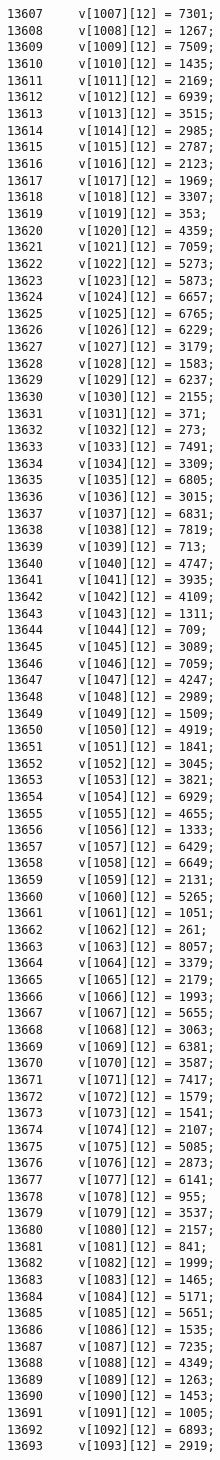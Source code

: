 \begin{Code}
\begin{verbatim}
13607     v[1007][12] = 7301;
13608     v[1008][12] = 1267;
13609     v[1009][12] = 7509;
13610     v[1010][12] = 1435;
13611     v[1011][12] = 2169;
13612     v[1012][12] = 6939;
13613     v[1013][12] = 3515;
13614     v[1014][12] = 2985;
13615     v[1015][12] = 2787;
13616     v[1016][12] = 2123;
13617     v[1017][12] = 1969;
13618     v[1018][12] = 3307;
13619     v[1019][12] = 353;
13620     v[1020][12] = 4359;
13621     v[1021][12] = 7059;
13622     v[1022][12] = 5273;
13623     v[1023][12] = 5873;
13624     v[1024][12] = 6657;
13625     v[1025][12] = 6765;
13626     v[1026][12] = 6229;
13627     v[1027][12] = 3179;
13628     v[1028][12] = 1583;
13629     v[1029][12] = 6237;
13630     v[1030][12] = 2155;
13631     v[1031][12] = 371;
13632     v[1032][12] = 273;
13633     v[1033][12] = 7491;
13634     v[1034][12] = 3309;
13635     v[1035][12] = 6805;
13636     v[1036][12] = 3015;
13637     v[1037][12] = 6831;
13638     v[1038][12] = 7819;
13639     v[1039][12] = 713;
13640     v[1040][12] = 4747;
13641     v[1041][12] = 3935;
13642     v[1042][12] = 4109;
13643     v[1043][12] = 1311;
13644     v[1044][12] = 709;
13645     v[1045][12] = 3089;
13646     v[1046][12] = 7059;
13647     v[1047][12] = 4247;
13648     v[1048][12] = 2989;
13649     v[1049][12] = 1509;
13650     v[1050][12] = 4919;
13651     v[1051][12] = 1841;
13652     v[1052][12] = 3045;
13653     v[1053][12] = 3821;
13654     v[1054][12] = 6929;
13655     v[1055][12] = 4655;
13656     v[1056][12] = 1333;
13657     v[1057][12] = 6429;
13658     v[1058][12] = 6649;
13659     v[1059][12] = 2131;
13660     v[1060][12] = 5265;
13661     v[1061][12] = 1051;
13662     v[1062][12] = 261;
13663     v[1063][12] = 8057;
13664     v[1064][12] = 3379;
13665     v[1065][12] = 2179;
13666     v[1066][12] = 1993;
13667     v[1067][12] = 5655;
13668     v[1068][12] = 3063;
13669     v[1069][12] = 6381;
13670     v[1070][12] = 3587;
13671     v[1071][12] = 7417;
13672     v[1072][12] = 1579;
13673     v[1073][12] = 1541;
13674     v[1074][12] = 2107;
13675     v[1075][12] = 5085;
13676     v[1076][12] = 2873;
13677     v[1077][12] = 6141;
13678     v[1078][12] = 955;
13679     v[1079][12] = 3537;
13680     v[1080][12] = 2157;
13681     v[1081][12] = 841;
13682     v[1082][12] = 1999;
13683     v[1083][12] = 1465;
13684     v[1084][12] = 5171;
13685     v[1085][12] = 5651;
13686     v[1086][12] = 1535;
13687     v[1087][12] = 7235;
13688     v[1088][12] = 4349;
13689     v[1089][12] = 1263;
13690     v[1090][12] = 1453;
13691     v[1091][12] = 1005;
13692     v[1092][12] = 6893;
13693     v[1093][12] = 2919;

\end{verbatim}
\end{Code}
